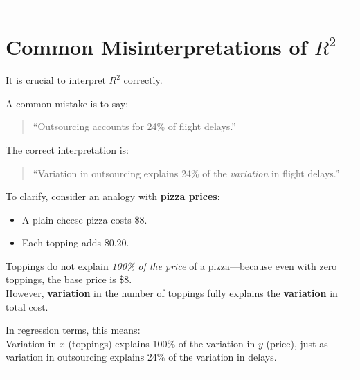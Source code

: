 \documentclass[
  letterpaper,
  DIV=11,
  numbers=noendperiod]{scrreprt}
\providecommand{\tightlist}{%
  \setlength{\itemsep}{0pt}\setlength{\parskip}{0pt}}
\begin{document}
\begin{center}\rule{0.5\linewidth}{0.5pt}\end{center}

\section{\texorpdfstring{Common Misinterpretations of
\(R^2\)}{Common Misinterpretations of R\^{}2}}\label{common-misinterpretations-of-r2}

It is crucial to interpret \(R^2\) correctly.

A common mistake is to say:

\begin{quote}
``Outsourcing accounts for 24\% of flight delays.''
\end{quote}

The correct interpretation is:

\begin{quote}
``Variation in outsourcing explains 24\% of the \emph{variation} in
flight delays.''
\end{quote}

To clarify, consider an analogy with \textbf{pizza prices}:

\begin{itemize}
\tightlist
\item
  A plain cheese pizza costs \$8.\\
\item
  Each topping adds \$0.20.
\end{itemize}

Toppings do not explain \emph{100\% of the price} of a pizza---because
even with zero toppings, the base price is \$8.\\
However, \textbf{variation} in the number of toppings fully explains the
\textbf{variation} in total cost.

In regression terms, this means:\\
Variation in \(x\) (toppings) explains 100\% of the variation in \(y\)
(price), just as variation in outsourcing explains 24\% of the variation
in delays.

\begin{center}\rule{0.5\linewidth}{0.5pt}\end{center}
\end{document}
